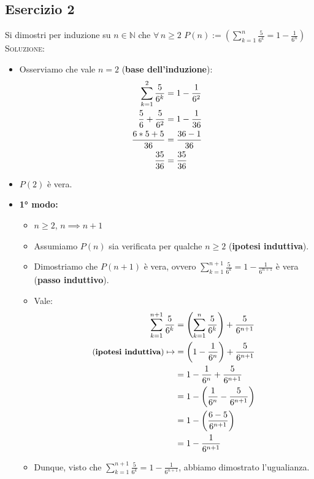 \documentclass[10pt]{article}
\begin{document}
	\subsection{Esercizio 2}
	Si dimostri per induzione su $n \!\in\! \mathbb{N}$ che $\forall \, n \geq 2$ $P(n) := \displaystyle{\left(\sum_{k=1}^n \frac{5}{6^k} = 1 - \frac{1}{6^n} \right)}$
	\\ \textsc{Soluzione:}
	\begin{itemize}
	\item
	Osserviamo che vale $n=2$ (\textbf{base dell'induzione}):
	\begin{equation}
	\begin{split}
	\displaystyle{\sum_{k=1}^2 \frac{5}{6^k}} &= \displaystyle{1 - \frac{1}{6^2}} \\
	\displaystyle{\frac{5}{6} + \frac{5}{6^2}} &= \displaystyle{1 - \frac{1}{36}} \\
	\displaystyle{\frac{6*5 + 5}{36}} &= \displaystyle{\frac{36 - 1}{36}} \\ 
	\displaystyle{\frac{35}{36}} &= \displaystyle{\frac{35}{36}}
	\notag
	\end{split}
	\end{equation}
	\item
	$P(2)$ è vera.
	\item
	\textbf{1° modo:}
	\begin{itemize}
	\item
	$n \!\geq\! 2$, $n \implies n+1$
	\item
	Assumiamo $P(n)$ sia verificata per qualche $n \geq 2$ (\textbf{ipotesi induttiva}).
	\item
	Dimostriamo che $P(n+1)$ è vera, ovvero $\displaystyle{\sum_{k=1}^{n+1} \frac{5}{6^k} = 1 - \frac{1}{6^{n+1}}}$ è vera (\textbf{passo induttivo}).
	\item
	Vale:
	\begin{equation}
	\begin{split}
	\sum_{k=1}^{n+1} \frac{5}{6^k} &= \left(\sum_{k=1}^{n} \frac{5}{6^k}\right) + \frac{5}{6^{n+1}} \\
	\textrm{\small{(\textbf{ipotesi induttiva})}} \mapsto &= \left(1 - \frac{1}{6^n} \right) + \frac{5}{6^{n+1}} \\
	&= 1 - \frac{1}{6^n} + \frac{5}{6^{n+1}} \\
	&= 1 - \left(\frac{1}{6^n} - \frac{5}{6^{n+1}}\right) \\
	&= 1 - \left(\frac{6-5}{6^{n+1}} \right) \\
	&= 1 - \frac{1}{6^{n+1}} 
	\notag
	\end{split}
	\end{equation}
	\item
	Dunque, visto che $\displaystyle{\sum_{k=1}^{n+1} \frac{5}{6^k} = 1 - \frac{1}{6^{n+1}}}$, abbiamo dimostrato l'ugualianza.
	\end{itemize}
	

\end{itemize}
\end{document}
